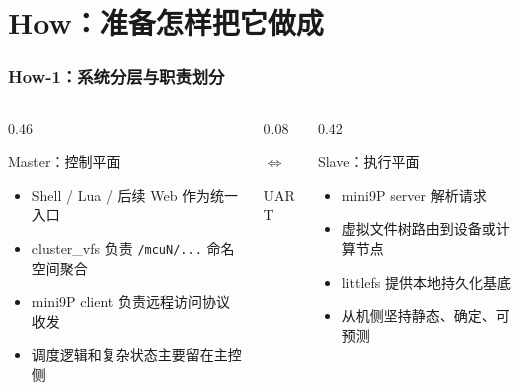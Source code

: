 \documentclass[aspectratio=169]{ctexbeamer}
\begin{document}
\section{How：准备怎样把它做成}

\begin{frame}
  \frametitle{How-1：系统分层与职责划分}
  \begin{columns}[T]
    \begin{column}{0.46\textwidth}
      \begin{block}{Master：控制平面}
        \small
        \begin{itemize}
          \item Shell / Lua / 后续 Web 作为统一入口
          \item cluster\_vfs 负责 \texttt{/mcuN/...} 命名空间聚合
          \item mini9P client 负责远程访问协议收发
          \item 调度逻辑和复杂状态主要留在主控侧
        \end{itemize}
      \end{block}
    \end{column}
    \begin{column}{0.08\textwidth}
      \vspace{1.5cm}
      \centerline{\Large $\Longleftrightarrow$}
      \centerline{\small UART}
    \end{column}
    \begin{column}{0.42\textwidth}
      \begin{block}{Slave：执行平面}
        \small
        \begin{itemize}
          \item mini9P server 解析请求
          \item 虚拟文件树路由到设备或计算节点
          \item littlefs 提供本地持久化基底
          \item 从机侧坚持静态、确定、可预测
        \end{itemize}
      \end{block}
    \end{column}
  \end{columns}
\end{frame}
\end{document}
